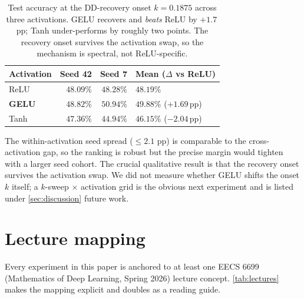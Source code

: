 \documentclass{article}
\begin{document}
\begin{table}[h]
  \centering
  \small
  \caption{Test accuracy at the DD-recovery onset $k\!=\!0.1875$ across three activations. GELU recovers and \emph{beats} ReLU by $+1.7$\,pp; Tanh under-performs by roughly two points. The recovery onset survives the activation swap, so the mechanism is spectral, not ReLU-specific.}
  \label{tab:activation}
  \begin{tabular}{lrrl}
    \toprule
    Activation & Seed 42 & Seed 7 & Mean ($\Delta$ vs ReLU) \\
    \midrule
    ReLU       & $48.09\%$ & $48.28\%$ & $48.19\%$ \\
    \textbf{GELU} & $48.82\%$ & $50.94\%$ & $\mathbf{49.88\%}$ ($+1.69$\,pp) \\
    Tanh       & $47.36\%$ & $44.94\%$ & $46.15\%$ ($-2.04$\,pp) \\
    \bottomrule
  \end{tabular}
\end{table}

The within-activation seed spread ($\le 2.1$ pp) is comparable to the cross-activation gap, so the ranking is robust but the precise margin would tighten with a larger seed cohort. The crucial qualitative result is that the recovery onset survives the activation swap. We did not measure whether GELU shifts the onset $k$ itself; a $k$-sweep $\times$ activation grid is the obvious next experiment and is listed under \cref{sec:discussion} future work.

\section{Lecture mapping}
\label{app:lectures}

Every experiment in this paper is anchored to at least one EECS 6699 (Mathematics of Deep Learning, Spring 2026) lecture concept. \cref{tab:lectures} makes the mapping explicit and doubles as a reading guide.
\end{document}

